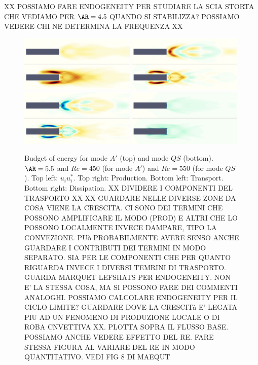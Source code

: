 XX POSSIAMO FARE ENDOGENEITY PER STUDIARE LA SCIA STORTA CHE VEDIAMO PER $\AR=4.5$ QUANDO SI STABILIZZA? POSSIAMO VEDERE CHI NE DETERMINA LA FREQUENZA XX

\begin{figure}
  \centering
  \includegraphics[width=0.49\textwidth]{./fig/AR5s/Ener_AR5p5_Re450_Re550_beta2.png}
  \includegraphics[width=0.49\textwidth]{./fig/AR5s/Prod_AR5p5_Re450_Re550_beta2.png}
  \includegraphics[width=0.49\textwidth]{./fig/AR5s/Trsp_AR5p5_Re450_Re550_beta2.png}
  \includegraphics[width=0.49\textwidth]{./fig/AR5s/Diss_AR5p5_Re450_Re550_beta2.png}
  \caption{Budget of energy for mode $A'$ (top) and mode $QS$ (bottom). $\AR=5.5$ and $Re=450$ (for mode $A'$) and $Re=550$ (for mode $QS$). Top left: $u_i u_i^*$. Top right: Production. Bottom left: Transport. Bottom right: Dissipation. XX DIVIDERE I COMPONENTI DEL TRASPORTO XX XX GUARDARE NELLE DIVERSE ZONE DA COSA VIENE LA CRESCITA. CI SONO DEI TERMINI CHE POSSONO AMPLIFICARE IL MODO (PROD) E ALTRI CHE LO POSSONO LOCALMENTE INVECE DAMPARE, TIPO LA CONVEZIONE. PUò PROBABILMENTE AVERE SENSO ANCHE GUARDARE I CONTRIBUTI DEI TERMINI IN MODO SEPARATO. SIA PER LE COMPONENTI CHE PER QUANTO RIGUARDA INVECE I DIVERSI TEMRINI DI TRASPORTO. GUARDA MARQUET LEFSHATS PER ENDOGENEITY. NON E' LA STESSA COSA, MA SI POSSONO FARE DEI COMMENTI ANALOGHI. POSSIAMO CALCOLARE ENDOGENEITY PER IL CICLO LIMITE? GUARDARE DOVE LA CRESCITà E' LEGATA PIU AD UN FENOMENO DI PRODUZIONE LOCALE O DI ROBA CNVETTIVA XX. PLOTTA SOPRA IL FLUSSO BASE. POSSIAMO ANCHE VEDERE EFFETTO DEL RE. FARE STESSA FIGURA AL VARIARE DEL RE IN MODO QUANTITATIVO. VEDI FIG 8 DI MAEQUT}
  \label{fig:budget_ener}
\end{figure}



